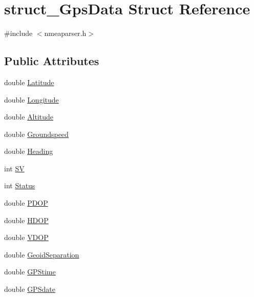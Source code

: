 \hypertarget{structstruct___gps_data}{\section{struct\-\_\-\-Gps\-Data \-Struct \-Reference}
\label{structstruct___gps_data}
}


{\ttfamily \#include $<$nmeaparser.\-h$>$}

\subsection*{\-Public \-Attributes}
\begin{DoxyCompactItemize}
\item 
double \hyperlink{group___g_p_s_gadget_plugin_ga22dd27dba6f143463f812eda429ca6ea}{\-Latitude}
\item 
double \hyperlink{group___g_p_s_gadget_plugin_ga63cb298938d490dd35e8a5dbd099f65e}{\-Longitude}
\item 
double \hyperlink{group___g_p_s_gadget_plugin_ga7114820c879b9cfa5c6511ee87fb7837}{\-Altitude}
\item 
double \hyperlink{group___g_p_s_gadget_plugin_ga96522460814507cd49570c6edbecdc4a}{\-Groundspeed}
\item 
double \hyperlink{group___g_p_s_gadget_plugin_ga11eede30f67268e28aac52350a2de20c}{\-Heading}
\item 
int \hyperlink{group___g_p_s_gadget_plugin_gad4c8228c92e708ffbf1205af7955a571}{\-S\-V}
\item 
int \hyperlink{group___g_p_s_gadget_plugin_gafecfb74415dbfe5f6bc3c950183eb3b2}{\-Status}
\item 
double \hyperlink{group___g_p_s_gadget_plugin_ga686c0fa6dc1d7aa494b494fe38bb8834}{\-P\-D\-O\-P}
\item 
double \hyperlink{group___g_p_s_gadget_plugin_ga7bea5e7cb8f6a97c8b2be703401218e3}{\-H\-D\-O\-P}
\item 
double \hyperlink{group___g_p_s_gadget_plugin_ga0c803c003d3d1261b1519a4b1f561ebe}{\-V\-D\-O\-P}
\item 
double \hyperlink{group___g_p_s_gadget_plugin_ga847e7e6776a9a2cdaf8c4cf0ce8e31ae}{\-Geoid\-Separation}
\item 
double \hyperlink{group___g_p_s_gadget_plugin_gaeedda11a0db9fe353ca149906deccb9f}{\-G\-P\-Stime}
\item 
double \hyperlink{group___g_p_s_gadget_plugin_ga5556ea2f7e4f0fb213a319e72a5961eb}{\-G\-P\-Sdate}
\end{DoxyCompactItemize}


